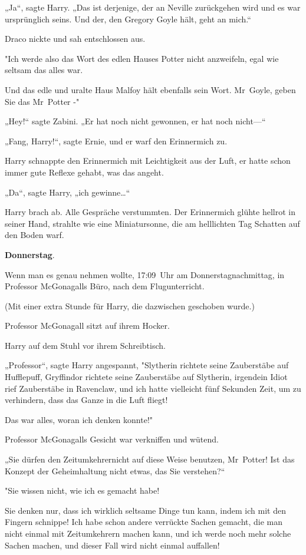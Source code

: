 {„Ja“, sagte Harry. „Das ist derjenige, der an Neville zurückgehen wird und es war ursprünglich seins. Und der, den Gregory Goyle hält, geht an mich.“

Draco nickte und sah entschlossen aus.

"Ich werde also das Wort des edlen Hauses Potter nicht anzweifeln, egal wie seltsam das alles war.

Und das edle und uralte Haus Malfoy hält ebenfalls sein Wort. Mr~Goyle, geben Sie das Mr~Potter -"

„Hey!“ sagte Zabini. „Er hat noch nicht gewonnen, er hat noch nicht—“

„Fang, Harry!“, sagte Ernie, und er warf den Erinnermich zu.

Harry schnappte den Erinnermich mit Leichtigkeit aus der Luft, er hatte schon immer gute Reflexe gehabt, was das angeht.

„Da“, sagte Harry, „ich gewinne…“

Harry brach ab. Alle Gespräche verstummten. Der Erinnermich glühte hellrot in seiner Hand, strahlte wie eine Miniatursonne, die am helllichten Tag Schatten auf den Boden warf.

\textbf{Donnerstag}.

Wenn man es genau nehmen wollte, 17:09~Uhr am Donnerstagnachmittag, in Professor McGonagalls Büro, nach dem Flugunterricht.

(Mit einer extra Stunde für Harry, die dazwischen geschoben wurde.)

Professor McGonagall sitzt auf ihrem Hocker.

Harry auf dem Stuhl vor ihrem Schreibtisch.

„Professor“, sagte Harry angespannt, "Slytherin richtete seine Zauberstäbe auf Hufflepuff, Gryffindor richtete seine Zauberstäbe auf Slytherin, irgendein Idiot rief Zauberstäbe in Ravenclaw, und ich hatte vielleicht fünf Sekunden Zeit, um zu verhindern, dass das Ganze in die Luft fliegt!

Das war alles, woran ich denken konnte!"

Professor McGonagalls Gesicht war verkniffen und wütend.

„Sie dürfen den Zeitumkehrernicht auf diese Weise benutzen, Mr~Potter! Ist das Konzept der Geheimhaltung nicht etwas, das Sie verstehen?“

"Sie wissen nicht, wie ich es gemacht habe!

Sie denken nur, dass ich wirklich seltsame Dinge tun kann, indem ich mit den Fingern schnippe! Ich habe schon andere verrückte Sachen gemacht, die man nicht einmal mit Zeitumkehrern machen kann, und ich werde noch mehr solche Sachen machen, und dieser Fall wird nicht einmal auffallen!

}
